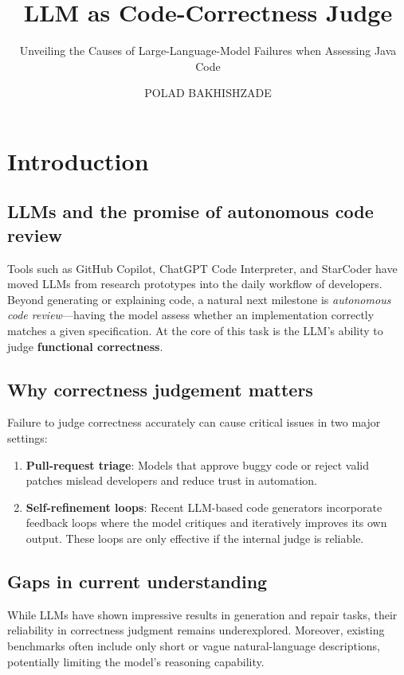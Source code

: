 \documentclass[a4paper]{usiinfbachelorproject}
\author{POLAD BAKHISHZADE}
\title{\textbf{LLM as Code-Correctness Judge}}
\subtitle{Unveiling the Causes of Large-Language-Model Failures when Assessing Java Code}
\begin{document}
\maketitle
\tableofcontents\newpage

\section{Introduction}\label{sec:intro}

\subsection{LLMs and the promise of autonomous code review}

Tools such as GitHub Copilot, ChatGPT Code Interpreter, and StarCoder have moved LLMs from research prototypes into the daily workflow of developers. Beyond generating or explaining code, a natural next milestone is \emph{autonomous code review}—having the model assess whether an implementation correctly matches a given specification. At the core of this task is the LLM’s ability to judge \textbf{functional correctness}.

\subsection{Why correctness judgement matters}

Failure to judge correctness accurately can cause critical issues in two major settings:

\begin{enumerate}[label=\textbf{S\arabic*},leftmargin=14pt,itemsep=0pt]
  \item \textbf{Pull-request triage}: Models that approve buggy code or reject valid patches mislead developers and reduce trust in automation.
  \item \textbf{Self-refinement loops}: Recent LLM-based code generators incorporate feedback loops where the model critiques and iteratively improves its own output. These loops are only effective if the internal judge is reliable.
\end{enumerate}

\subsection{Gaps in current understanding}

While LLMs have shown impressive results in generation and repair tasks, their reliability in correctness judgment remains underexplored. Moreover, existing benchmarks often include only short or vague natural-language descriptions, potentially limiting the model’s reasoning capability.
\end{document}
